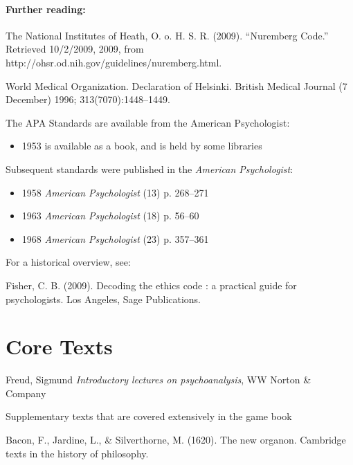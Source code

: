 \begin{refsection}
\subsubsection{Further reading:}
\label{furtherreading:}

The National Institutes of Heath, O. o. H. S. R. (2009). ``Nuremberg Code.'' Retrieved 10\slash 2\slash 2009, 2009, from http:\slash \slash ohsr.od.nih.gov\slash guidelines\slash nuremberg.html.

World Medical Organization. Declaration of Helsinki. British Medical Journal (7 December) 1996; 313(7070):1448--1449.

The APA Standards are available from the American Psychologist:

\begin{itemize}
\item 1953 is available as a book, and is held by some libraries

\end{itemize}

Subsequent standards were published in the \emph{American Psychologist}:

\begin{itemize}
\item 1958 \emph{American Psychologist} (13) p. 268--271

\item 1963 \emph{American Psychologist} (18) p. 56--60

\item 1968 \emph{American Psychologist} (23) p. 357--361

\end{itemize}

For a historical overview, see:

Fisher, C. B. (2009). Decoding the ethics code : a practical guide for psychologists. Los Angeles, Sage Publications.

\pagebreak 

\chapter{Core Texts}
\label{coretexts}

Freud, Sigmund \emph{Introductory lectures on psychoanalysis}, WW Norton \& Company

Supplementary texts that are covered extensively in the game book

Bacon, F., Jardine, L., \& Silverthorne, M. (1620). The new organon. Cambridge texts in the history of philosophy.


\end{refsection}
